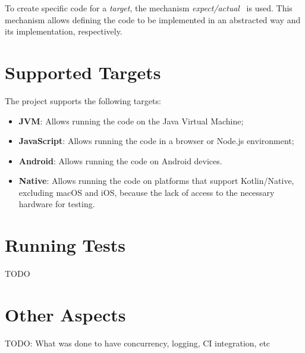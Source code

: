 To create specific code for a \textit{target}, the mechanism \textit{expect/actual}~\cite{kmp-expect-actual} is used.
This mechanism allows defining the code to be implemented in an abstracted way and its implementation, respectively.


\section{Supported Targets}\label{sec:supported-targets}

The project supports the following targets:

\begin{itemize}
    \item \textbf{JVM}: Allows running the code on the Java Virtual Machine;
    \item \textbf{JavaScript}: Allows running the code in a browser or Node.js environment;
    \item \textbf{Android}: Allows running the code on Android devices.
    \item \textbf{Native}: Allows running the code on platforms that support Kotlin/Native, excluding macOS and iOS, because the lack of access to the necessary hardware for testing.
\end{itemize}

\section{Running Tests}\label{sec:running-tests}
TODO


\section{Other Aspects}\label{sec:other-aspects}
TODO: What was done to have concurrency, logging, CI integration, etc
